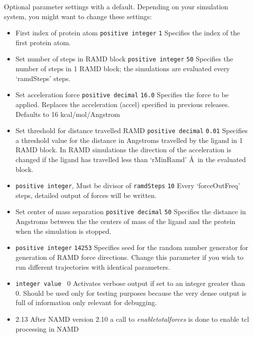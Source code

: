 Optional parameter settings with a default. Depending on your simulation system, you might want to change these settings:\\
\begin{itemize}
\item
{} {First index of protein atom} {{\tt positive integer}} {{\tt 1}} { Specifies the index of the first protein atom.}
 
\item
{} { Set number of steps in RAMD block} {{\tt positive integer}} {{\tt 50}} {Specifies the number of steps in 1 RAMD block; the simulations are evaluated every `ramdSteps' steps.} 

\item
{} {Set acceleration force} {{\tt positive decimal}} {{\tt 16.0}} {Specifies the force to be applied. Replaces the acceleration (accel) specified in previous releases. Defaults to 16 kcal/mol/Angstrom}

\item
{} {Set threshold for distance travelled RAMD} {{\tt positive decimal}} {{\tt 0.01}} {Specifies a threshold value for the distance in Angstroms travelled by the ligand in 1 RAMD block. In RAMD simulations the direction of the acceleration is changed if the ligand has travelled less than `rMinRamd' \AA\ in the evaluated block. 
}

\item
{} {{\tt positive integer}, Must be divisor of {\tt ramdSteps}} {{\tt 10}} { Every `forceOutFreq' steps, detailed output of forces will be written.} 

\item
{} {Set center of mass separation} {{\tt positive decimal}} {{\tt 50}} { Specifies the distance in Angstroms between the the centers of mass of the ligand and the protein when the simulation is stopped.}
 

\item
{} {{\tt positive integer}} {{\tt 14253}} {Specifies seed for the random number generator for generation of RAMD force directions. Change this parameter if you wish to run different trajectories with identical parameters.}

\item
{} {\tt integer value } {0} { Activates verbose output if set to an integer greater than 0. Should be used only for testing purposes because the very dense output is full of information only relevant for debugging.}

\item
{} {2.13} { After NAMD version 2.10 a call to {\em enabletotalforces} is done to enable tcl processing in NAMD}

\end{itemize}

